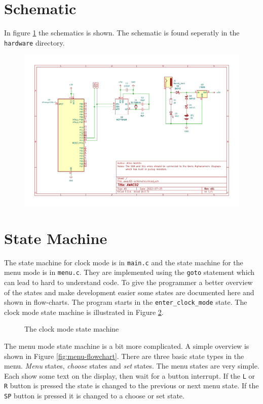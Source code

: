 \documentclass{awac02}
\begin{document}
\section{Schematic}

In figure \ref{fig:schematic} the schematics is shown. The schematic is found
seperatly in the \texttt{hardware} directory.

\begin{figure}[h]
    \includegraphics[width=\textwidth]{../hardware/AWAC02-v01}
    \label{fig:schematic}
\end{figure}

\section{State Machine}

The state machine for clock mode is in \texttt{main.c} and the state machine
for the menu mode is in \texttt{menu.c}. They are implemented using the
\texttt{goto} statement which can lead to hard to understand code.  To give the
programmer a better overview of the states and make development easier some
states are documented here and shown in flow-charts. The program starts in the
\texttt{enter\_clock\_mode} state. The clock mode state machine is illustrated
in Figure \ref{fig:clock-state}.

\begin{figure}[h]
    \centering
    
    \caption{The clock mode state machine}
    \label{fig:clock-state}
\end{figure}

The menu mode state machine is a bit more complicated. A simple overview is
shown in Figure \ref{fig:menu-flowchart}. There are three basic state types in the
menu. \emph{Menu} states, \emph{choose} states and \emph{set} states. The menu
states are very simple. Each show some text on the display, then wait for a
button interrupt. If the \texttt{L} or \texttt{R} button is pressed the
state is changed to the previous or next menu state. If the \texttt{SP} button
is pressed it is changed to a choose or set state.
\end{document}

